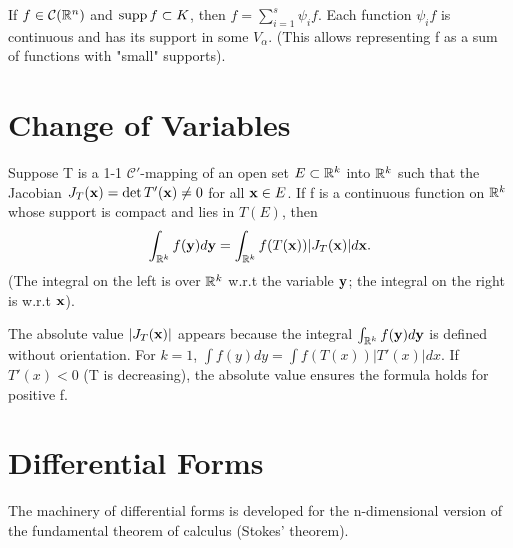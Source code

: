 \begin{corollary}
  \label{cor:chap10:partition_unity_application}
  If $f \in \mathcal{C}(\mathbb{R}^n)$ and $\operatorname{supp} f \subset K$, then $f =
  \sum_{i=1}^s \psi_i f$. Each function $\psi_i f$ is continuous and
  has its support in some $V_\alpha$. (This allows representing f as
  a sum of functions with "small" supports).
\end{corollary}



\section{Change of Variables}

\begin{theorem}
  \label{thm:chap10:change_of_variables}
  Suppose T is a 1-1 $\mathcal{C}'$-mapping of an open set $E \subset
  \mathbb{R}^k$ into $\mathbb{R}^k$ such that the Jacobian $J_T(\mathbf{x}) = \det
  T'(\mathbf{x}) \ne 0$ for all $\mathbf{x} \in E$. If f is a continuous
  function on $\mathbb{R}^k$ whose support is compact and lies in $T(E)$, then
  \[
    \int_{\mathbb{R}^k} f(\mathbf{y}) d\mathbf{y} = \int_{\mathbb{R}^k} f(T(\mathbf{x}))
    |J_T(\mathbf{x})| d\mathbf{x}.
  \]
  (The integral on the left is over $\mathbb{R}^k$ w.r.t the variable
  $\mathbf{y}$; the integral on the right is w.r.t $\mathbf{x}$).
\end{theorem}

\begin{remark}
  The absolute value $|J_T(\mathbf{x})|$ appears because the integral
  $\int_{\mathbb{R}^k} f(\mathbf{y}) d\mathbf{y}$ is defined without orientation.
  For $k=1$, $\int f(y) dy = \int f(T(x)) |T'(x)| dx$. If $T'(x) < 0$
  (T is decreasing), the absolute value ensures the formula holds for
  positive f.
\end{remark}

\section{Differential Forms}

The machinery of differential forms is developed for the
n-dimensional version of the fundamental theorem of calculus (Stokes' theorem).

